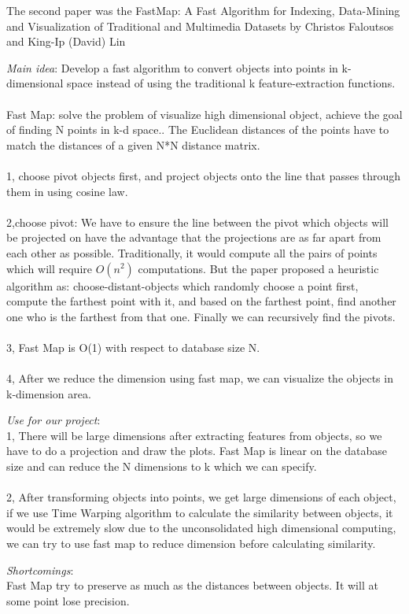 The second paper was the FastMap: A Fast Algorithm for Indexing, Data-Mining and Visualization of Traditional and Multimedia Datasets by Christos Faloutsos and King-Ip (David) Lin
\begin{itemize*}
\item {\em Main idea}:
 Develop a fast algorithm to convert objects into points in k-dimensional space instead of using the traditional k feature-extraction functions.\\\\
Fast Map: solve the problem of visualize high dimensional object, achieve the goal of finding N points in k-d space.. The Euclidean distances of the points have to match the distances of a given N*N distance matrix. \\\\
1, choose pivot objects first, and project objects onto the line that passes through them in using cosine law. \\\\
2,choose pivot: We have to ensure the line between the pivot which objects will be projected on have the advantage that the projections are as far apart from each other as possible. Traditionally, it would compute all the pairs of points which will require $O(n^2)$ computations. But the paper proposed a heuristic algorithm as: choose-distant-objects which randomly choose a point first, compute the farthest point with it, and based on the farthest point, find another one who is the farthest from that one. Finally we can recursively find the pivots. \\\\
3, Fast Map is O(1) with respect to database size N.\\\\
4, After we reduce the dimension using fast map, we can visualize the objects in k-dimension area.\\
\item {\em Use for our project}:\\
1, There will be large dimensions after extracting features from objects, so we have to do a projection and draw the plots. Fast Map is linear on the database size and can reduce the N dimensions to k which we can specify.  \\\\
2, After transforming objects into points, we get large dimensions of each object, if we use Time Warping algorithm to calculate the similarity between objects, it would be extremely slow due to the unconsolidated high dimensional computing, we can try to use fast map to reduce dimension before calculating similarity.\\
\item {\em Shortcomings}:\\
Fast Map try to preserve as much as the distances between objects. It will at some point lose precision.\\\\
\end{itemize*}
